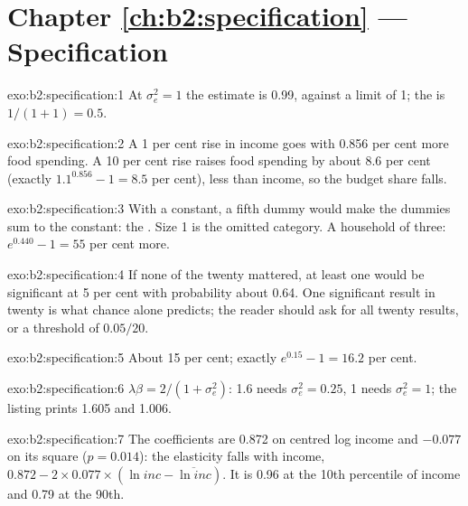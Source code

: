 \section*{Chapter \ref{ch:b2:specification} --- Specification}

\begin{solution}{exo:b2:specification:1}
At $\sigma_e^2 = 1$ the estimate is 0.99, against a limit of 1; the  is $1/(1 + 1) = 0.5$.
\end{solution}

\begin{solution}{exo:b2:specification:2}
A 1 per cent rise in income goes with 0.856 per cent more food spending. A 10 per cent rise raises food spending by about
8.6 per cent (exactly $1.1^{0.856} - 1 = 8.5$ per cent), less than income, so the budget share falls.
\end{solution}

\begin{solution}{exo:b2:specification:3}
With a constant, a fifth dummy would make the dummies sum to the constant: the . Size 1 is the omitted
category. A household of three: $e^{0.440} - 1 = 55$ per cent more.
\end{solution}

\begin{solution}{exo:b2:specification:4}
If none of the twenty mattered, at least one would be significant at 5 per cent with probability about 0.64. One
significant result in twenty is what chance alone predicts; the reader should ask for all twenty results, or a threshold
of $0.05/20$.
\end{solution}

\begin{solution}{exo:b2:specification:5}
About 15 per cent; exactly $e^{0.15} - 1 = 16.2$ per cent.
\end{solution}

\begin{solution}{exo:b2:specification:6}
$\lambda\beta = 2/(1 + \sigma_e^2)$: 1.6 needs $\sigma_e^2 = 0.25$, 1 needs $\sigma_e^2 = 1$; the listing prints 1.605 and
1.006.
\end{solution}

\begin{solution}{exo:b2:specification:7}
The coefficients are 0.872 on centred log income and $-0.077$ on its square ($p = 0.014$): the elasticity falls with
income, $0.872 - 2 \times 0.077 \times (\ln\mathit{inc} - \overline{\ln\mathit{inc}})$. It is 0.96 at the 10th percentile of
income and 0.79 at the 90th.
\end{solution}

